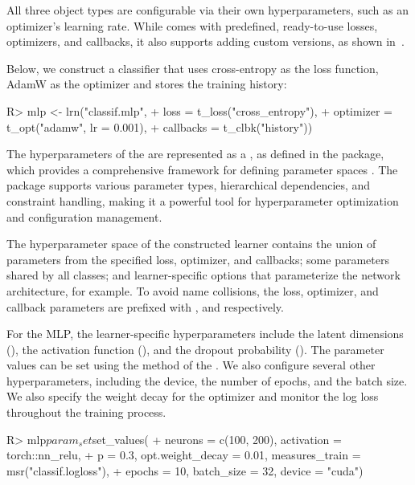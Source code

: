 \documentclass[article]{jss}
\theoremstyle{definition}
\begin{document}
All three object types are configurable via their own hyperparameters, such as an optimizer's learning rate.
While  comes with predefined, ready-to-use losses, optimizers, and callbacks, it also supports adding custom versions, as shown in~.

Below, we construct a  classifier that uses cross-entropy as the loss function, AdamW as the optimizer \citep{ref-loshchilov2017decoupled} and stores the training history:

\begin{CodeInput}
R> mlp <- lrn("classif.mlp",
+   loss = t_loss("cross_entropy"),
+   optimizer = t_opt("adamw", lr = 0.001),
+   callbacks = t_clbk("history"))
\end{CodeInput}

The hyperparameters of the  are represented as a , as defined in the  package, which provides a comprehensive framework for defining parameter spaces \citep{ref-paradox2024}.
The package supports various parameter types, hierarchical dependencies, and constraint handling, making it a powerful tool for hyperparameter optimization and configuration management.

The hyperparameter space of the constructed learner contains the union of parameters from the specified loss, optimizer, and callbacks; some parameters shared by all  classes; and learner-specific options that parameterize the network architecture, for example.
To avoid name collisions, the loss, optimizer, and callback parameters are prefixed with ,  and  respectively.

For the MLP, the learner-specific hyperparameters include the latent dimensions (), the activation function (), and the dropout probability ().
The parameter values can be set using the  method of the .
We also configure several other hyperparameters, including the device, the number of epochs, and the batch size.
We also specify the weight decay for the optimizer and monitor the log loss throughout the training process.

\begin{CodeInput}
R> mlp$param_set$set_values(
+    neurons = c(100, 200), activation = torch::nn_relu,
+    p = 0.3, opt.weight_decay = 0.01, measures_train = msr("classif.logloss"),
+    epochs = 10, batch_size = 32, device = "cuda")
\end{CodeInput}
\end{document}
